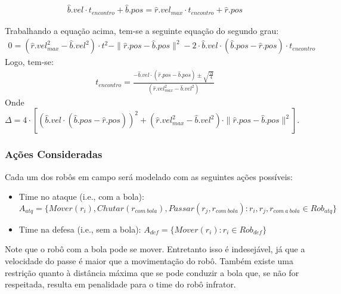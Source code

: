 \begin{gather}
  \hat{b}.vel \cdot t_{encontro} + \hat{b}.pos = \hat{r}.vel_{max} \cdot t_{encontro} + \hat{r}.pos
\end{gather}

Trabalhando a equação acima, tem-se a seguinte equação do segundo grau:
\begin{gather}  
  0 = (\hat{r}.vel^2_{max}-\hat{b}.vel^2) \cdot t^2 - \parallel \hat{r}.pos - \hat{b}.pos \parallel ^2
     - 2 \cdot \hat{b}.vel \cdot (\hat{b}.pos - \hat{r}.pos) \cdot t_{encontro}
\end{gather}
Logo, tem-se:
\begin{gather}  
  \boxed{t_{encontro} = \frac{ - \hat{b}.vel \cdot (\hat{r}.pos - \hat{b}.pos) \pm \sqrt {\frac{\Delta}{4}}}
                 {(\hat{r}.vel^2_{max} - \hat{b}.vel^2)}}
\end{gather}
Onde $\Delta = 4 \cdot [ ( \hat{b}.vel \cdot (\hat{b}.pos - \hat{r}.pos)) ^2 +
           (\hat{r}.vel_{max}^2 - \hat{b}.vel^2) \cdot \parallel \hat{r}.pos - \hat{b}.pos \parallel ^2]$.

\subsubsection{Ações Consideradas}
Cada um dos robôs em campo será modelado com as seguintes ações possíveis:
\begin{itemize}
  \item Time no ataque (i.e., com a bola):\\
        $A_{atq} = \lbrace Mover(r_i), Chutar(r_{com{\ }bola}), Passar(r_j,r_{com{\ }bola}):
                    r_i, r_j, r_{com{\ }a{\ }bola} \in Rob_{atq}\rbrace$

  \item Time na defesa (i.e., sem a bola):
        $A_{def} = \lbrace Mover(r_i): r_i \in Rob_{def}\rbrace$
\end{itemize}


Note que o robô com a bola pode se mover. Entretanto isso é indesejável, já que
a velocidade do passe é maior que a movimentação do robô. Também existe uma
restrição quanto à distância máxima que se pode conduzir a bola que, se não
for respeitada, resulta em penalidade para o time do robô infrator.

